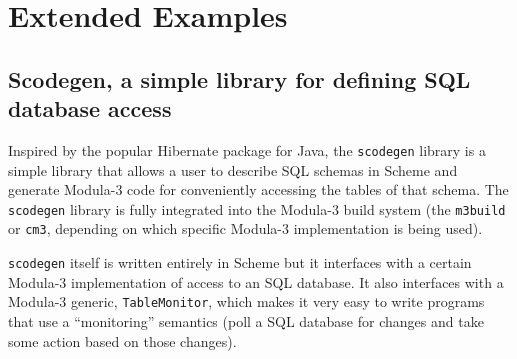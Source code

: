 
\chapter{Extended Examples}

\section{Scodegen, a simple library for defining SQL database access}

Inspired by the popular Hibernate package for Java, the {\tt scodegen}
library is a simple library that allows a user to describe SQL schemas
in Scheme and generate Modula-3 code for conveniently accessing the
tables of that schema.  The {\tt scodegen} library is fully integrated
into the Modula-3 build system (the {\tt m3build} or {\tt cm3},
depending on which specific Modula-3 implementation is being used).

{\tt scodegen} itself is written entirely in Scheme but it interfaces
with a certain Modula-3 implementation of access to an SQL database.
It also interfaces with a Modula-3 generic, {\tt TableMonitor}, which
makes it very easy to write programs that use a ``monitoring''
semantics (poll a SQL database for changes and take some action based
on those changes).


